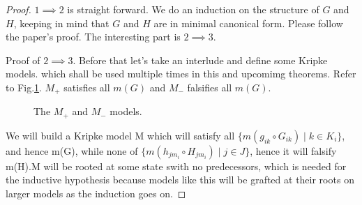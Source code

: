 \documentclass[10pt]{article}
\begin{document}
		\begin{proof}
			$1 \implies 2$ is straight forward. We do an induction on the structure of $G$ and $H$, keeping in mind that $G$ and $H$ are in minimal canonical form. Please follow the paper's proof. The interesting part is $2 \implies 3$.
			
			Proof of $2 \implies 3$. Before that let's take an interlude and define some Kripke models. which shall be used multiple times in this and upcomimg theorems. Refer to Fig.\ref{fig:M+M-}. $M_+$ satisfies all $m(G)$ and $M_-$ falsifies all $m(G)$.
			
			\begin{figure}[ht]
				\centering
				\begin{subfigure}[c]{0.9\textwidth}
					\centering
				\end{subfigure}
				\caption{The $M_+$ and $M_-$ models.}
				\label{fig:M+M-}
			\end{figure}
			
			We will build a Kripke model M which will satisfy all $\{m(g_{ik} \circ G_{ik})\mid k\in K_i\}$, and hence m(G), while none of $\{m(h_{jm_i} \circ H_{jm_i})\mid j \in J\}$, hence it will
			falsify m(H).M will be rooted at some state swith no predecessors, which is needed for the inductive hypothesis because models like this will be grafted at their roots on larger models as the induction goes on. 
			

\end{proof}
\end{document}
